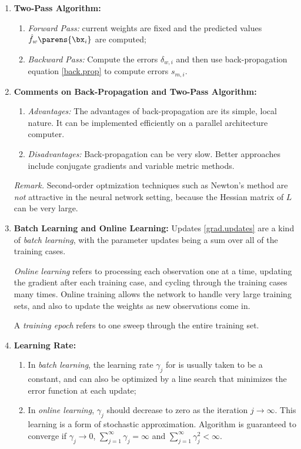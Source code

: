 \documentclass[12pt]{article}
\begin{document}
\begin{enumerate}[label=\textbf{\arabic*.}]
	\item \textbf{Two-Pass Algorithm:} 
	\begin{enumerate}
		\item \textit{Forward Pass:} current weights are fixed and the predicted values $\hat{f}_w \parens{\bx_i}$ are computed; 
		\item \textit{Backward Pass:} Compute the errors $\delta_{w,i}$ and then use back-propagation equation \eqref{back.prop} to compute errors $s_{m,i}$. 
	\end{enumerate}
	
	\item \textbf{Comments on Back-Propagation and Two-Pass Algorithm:} 
	\begin{enumerate}
		\item \textit{Advantages:} The advantages of back-propagation are its simple, local nature. It can be implemented efficiently on a parallel architecture computer. 
	
		\item \textit{Disadvantages:} Back-propagation can be very slow. Better approaches include conjugate gradients and variable metric methods. 
	\end{enumerate}
	
	\textit{Remark.} Second-order optmization techniques such as Newton's method are \emph{not} attractive in the neural network setting, because the Hessian matrix of $L$ can be very large. 
	
	\item \textbf{Batch Learning and Online Learning:} Updates \eqref{grad.updates} are a kind of \textit{batch learning}, with the parameter updates being a sum over all of the training cases. 

	\textit{Online learning} refers to processing each observation one at a time, updating the gradient after each training case, and cycling through the training cases many times. Online training allows the network to handle very large training sets, and also to update the weights as new observations come in. 
	
	A \textit{training epoch} refers to one sweep through the entire training set. 
	
	\item \textbf{Learning Rate:} 
	\begin{enumerate}
		\item In \textit{batch learning}, the learning rate $\gamma_j$ for is usually taken to be a constant, and can also be optimized by a line search that minimizes the error function at each update; 
		\item In \textit{online learning}, $\gamma_j$ should decrease to zero as the iteration $j \to \infty$. This learning is a form of stochastic approximation. Algorithm is guaranteed to converge if $\gamma_j \to 0$, $\sum_{j=1}^{\infty} \gamma_j = \infty$ and $\sum_{j=1}^{\infty} \gamma^2_j < \infty$. 
	\end{enumerate}
	
\end{enumerate}
\end{document}

